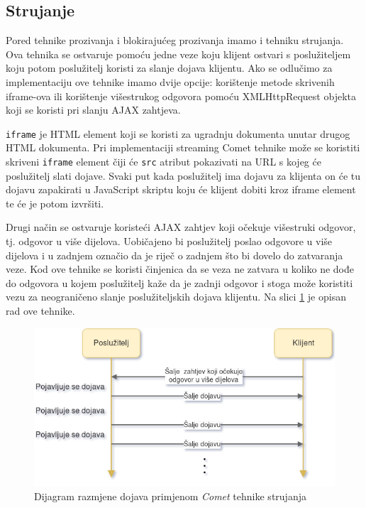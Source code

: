 \documentclass[times, utf8, zavrsni]{fer}
\begin{document}
\subsection{Strujanje}
Pored tehnike prozivanja i blokirajućeg prozivanja imamo i tehniku strujanja. Ova tehnika se ostvaruje pomoću jedne veze koju klijent ostvari s poslužiteljem koju potom poslužitelj koristi za slanje dojava klijentu. Ako se odlučimo za implementaciju ove tehnike imamo dvije opcije: korištenje metode skrivenih iframe-ova ili korištenje višestrukog odgovora pomoću XMLHttpRequest objekta koji se koristi pri slanju AJAX zahtjeva.

{\tt iframe} je HTML element koji se koristi za ugradnju dokumenta unutar drugog HTML dokumenta. Pri implementaciji streaming Comet tehnike može se koristiti skriveni {\tt iframe} element čiji će {\tt src}  atribut pokazivati na URL s kojeg će poslužitelj slati dojave. Svaki put kada poslužitelj ima dojavu za klijenta on će tu dojavu zapakirati u JavaScript skriptu koju će klijent dobiti kroz iframe element te će je potom izvršiti.

Drugi način se ostvaruje koristeći AJAX zahtjev koji očekuje višestruki odgovor, tj. odgovor u više dijelova. Uobičajeno bi poslužitelj poslao odgovore u više dijelova i u zadnjem označio da je riječ o zadnjem što bi dovelo do zatvaranja veze. Kod ove tehnike se koristi činjenica da se veza ne zatvara u koliko ne dođe do odgovora u kojem poslužitelj kaže da je zadnji odgovor i stoga može koristiti vezu za neograničeno slanje poslužiteljskih dojava klijentu. Na slici \ref{fig:streaming-image} je opisan rad ove tehnike. \citep{carbou2011}

\begin{figure}[htb]
\centering
\includegraphics[width=\linewidth]{img/streaming.png}
\caption{Dijagram razmjene dojava primjenom {\em Comet} tehnike strujanja}
\label{fig:streaming-image}
\end{figure}
\end{document}
